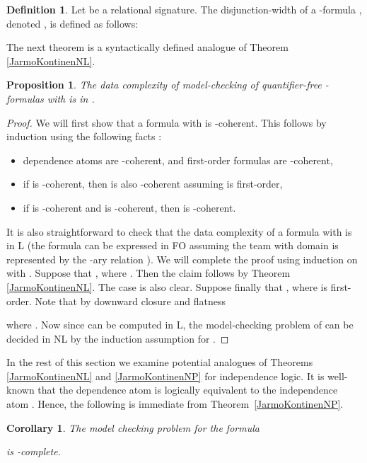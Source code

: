 \documentclass{article}
\theoremstyle{plain}
\newtheorem{corollary}[theorem]{Corollary}
\newtheorem{proposition}[theorem]{Proposition}
\theoremstyle{definition}
\newtheorem{definition}[theorem]{Definition}
\begin{document}
\begin{definition} Let  be a relational signature. The disjunction-width of a -formula , denoted , is defined as follows:

\end{definition}

The next theorem  is a syntactically defined analogue of Theorem  \ref{JarmoKontinenNL}.
\begin{proposition}\label{disjunction depth 2}
The data complexity of  model-checking of quantifier-free -formulas   with  is in  .
\end{proposition}

\begin{proof} We will first show that a formula   with  is -coherent.
 This follows by induction using the following facts \cite{kontinenj13}: 
 \begin{itemize}
\item dependence atoms are -coherent, and first-order formulas are -coherent,
\item if  is -coherent, then  is also -coherent assuming   is first-order,
\item  if    is -coherent and   is -coherent, then   is -coherent.
\end{itemize}
It is also straightforward to check that the data complexity of a formula   with  is in L (the formula  can be  expressed in FO assuming the team  with domain  is represented by the -ary relation ). We will complete the  proof using induction on  with  
 .  Suppose that  , where  . Then the claim follows by Theorem  \ref{JarmoKontinenNL}. The case  is also clear. Suppose finally  that , where  is first-order. Note that by downward closure and flatness
 
where . Now since  can be computed in L,  the model-checking problem of  can be decided in NL by the induction assumption for . \end{proof}


In the rest of this section we examine potential  analogues of Theorems \ref{JarmoKontinenNL} and \ref{JarmoKontinenNP} for  independence logic. It is well-known that the dependence atom  is logically equivalent to the independence atom . Hence, the following is immediate from Theorem~\ref{JarmoKontinenNP}.


\begin{corollary}\label{3 disjunction relativized independance}
The model checking problem for the formula 

 is -complete.
\end{corollary}
\end{document}
